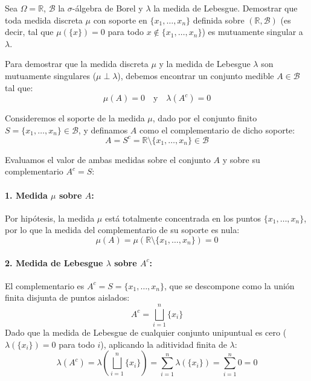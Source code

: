 \newpage
\begin{problema}
Sea $\Omega = \mathbb{R}$, $\mathcal{B}$ la $\sigma$-álgebra de Borel y $\lambda$ la medida de Lebesgue. Demostrar que toda medida discreta $\mu$ con soporte en $\{x_1, \dots, x_n\}$ definida sobre $(\mathbb{R}, \mathcal{B})$ (es decir, tal que $\mu(\{x\}) = 0$ para todo $x \notin \{x_1, \dots, x_n\}$) es mutuamente singular a $\lambda$.

\tcblower

Para demostrar que la medida discreta $\mu$ y la medida de Lebesgue $\lambda$ son mutuamente singulares ($\mu \perp \lambda$), debemos encontrar un conjunto medible $A \in \mathcal{B}$ tal que:
\[
    \mu(A) = 0 \quad \text{y} \quad \lambda(A^c) = 0
\]

Consideremos el soporte de la medida $\mu$, dado por el conjunto finito $S = \{x_1, \dots, x_n\} \in \mathcal{B}$, y definamos $A$ como el complementario de dicho soporte:
\[
    A = S^c = \mathbb{R} \setminus \{x_1, \dots, x_n\} \in \mathcal{B}
\]

Evaluamos el valor de ambas medidas sobre el conjunto $A$ y sobre su complementario $A^c = S$:

\paragraph{1. Medida $\mu$ sobre $A$:}
Por hipótesis, la medida $\mu$ está totalmente concentrada en los puntos $\{x_1, \dots, x_n\}$, por lo que la medida del complementario de su soporte es nula:
\[
    \mu(A) = \mu(\mathbb{R} \setminus \{x_1, \dots, x_n\}) = 0
\]

\paragraph{2. Medida de Lebesgue $\lambda$ sobre $A^c$:}
El complementario es $A^c = S = \{x_1, \dots, x_n\}$, que se descompone como la unión finita disjunta de puntos aislados:
\[
    A^c = \bigsqcup_{i=1}^n \{x_i\}
\]
Dado que la medida de Lebesgue de cualquier conjunto unipuntual es cero ($\lambda(\{x_i\}) = 0$ para todo $i$), aplicando la aditividad finita de $\lambda$:
\[
    \lambda(A^c) = \lambda\left( \bigsqcup_{i=1}^n \{x_i\} \right) = \sum_{i=1}^n \lambda(\{x_i\}) = \sum_{i=1}^n 0 = 0
\]


\end{problema}

